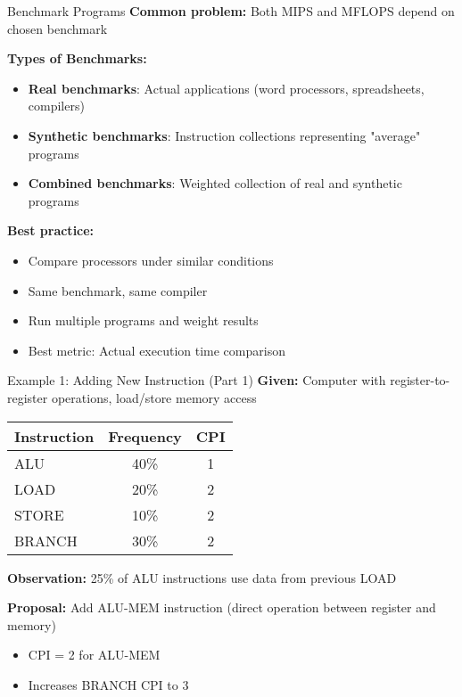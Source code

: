 \documentclass[aspectratio=169,12pt]{beamer}
\begin{document}
\begin{frame}{Benchmark Programs}
\textbf{Common problem:} Both MIPS and MFLOPS depend on chosen benchmark

\vspace{0.5em}
\textbf{Types of Benchmarks:}
\begin{itemize}
    \item \textbf{Real benchmarks}: Actual applications (word processors, spreadsheets, compilers)
    \item \textbf{Synthetic benchmarks}: Instruction collections representing "average" programs
    \item \textbf{Combined benchmarks}: Weighted collection of real and synthetic programs
\end{itemize}

\vspace{0.5em}
\textbf{Best practice:}
\begin{itemize}
    \item Compare processors under similar conditions
    \item Same benchmark, same compiler
    \item Run multiple programs and weight results
    \item Best metric: Actual execution time comparison
\end{itemize}
\end{frame}

\begin{frame}{Example 1: Adding New Instruction (Part 1)}
\textbf{Given:} Computer with register-to-register operations, load/store memory access

\begin{table}[h]
\centering
\begin{tabular}{lcc}
\toprule
Instruction & Frequency & CPI \\
\midrule
ALU & 40\% & 1 \\
LOAD & 20\% & 2 \\
STORE & 10\% & 2 \\
BRANCH & 30\% & 2 \\
\bottomrule
\end{tabular}
\end{table}

\textbf{Observation:} 25\% of ALU instructions use data from previous LOAD

\textbf{Proposal:} Add ALU-MEM instruction (direct operation between register and memory)
\begin{itemize}
    \item CPI = 2 for ALU-MEM
    \item Increases BRANCH CPI to 3
\end{itemize}
\end{frame}
\end{document}
